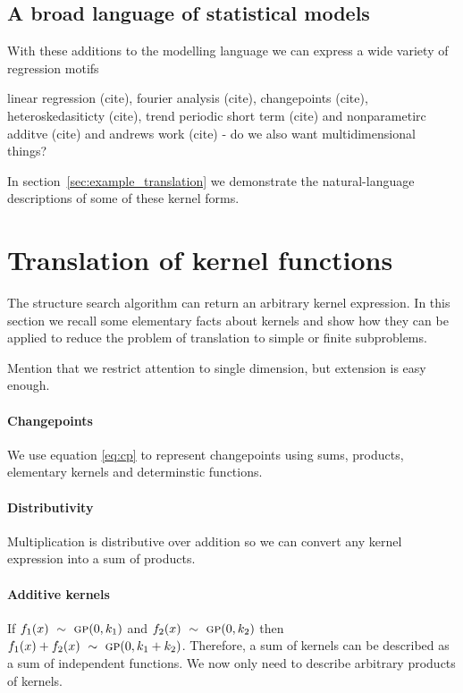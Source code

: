 \documentclass{article}
\begin{document}
\subsection{A broad language of statistical models}

With these additions to the modelling language we can express a wide variety of regression motifs

linear regression (cite), fourier analysis (cite), changepoints (cite), heteroskedasiticty (cite), trend periodic short term (cite) and nonparametirc additve (cite) and andrews work (cite) - do we also want multidimensional things?

In section~\ref{sec:example_translation} we demonstrate the natural-language descriptions of some of these kernel forms.

\section{Translation of kernel functions}
\label{sec:translation}

The structure search algorithm can return an arbitrary kernel expression.
In this section we recall some elementary facts about kernels and show how they can be applied to reduce the problem of translation to simple or finite subproblems.

Mention that we restrict attention to single dimension, but extension is easy enough.

\paragraph{Changepoints}

We use equation \eqref{eq:cp} to represent changepoints using sums, products, elementary kernels and determinstic functions.

\paragraph{Distributivity}

Multiplication is distributive over addition so we can convert any kernel expression into a sum of products.

\paragraph{Additive kernels}

If $f_1(x) \ \sim\  {\textsc{gp}}{}(0, k_1)$ and $f_2(x) \ \sim\  {\textsc{gp}}{}(0, k_2)$ then $f_1(x) + f_2(x) \ \sim\  {\textsc{gp}}{}(0, k_1 + k_2)$.
Therefore, a sum of kernels can be described as a sum of independent functions.
We now only need to describe arbitrary products of kernels.
\end{document}
